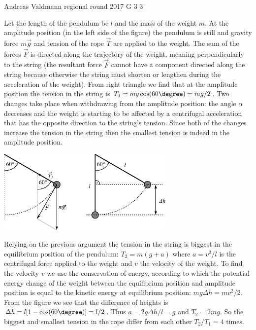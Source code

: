 \documentclass[11pt]{article}
\begin{document}
{Andreas Valdmann} %
{regional round} %
{2017} %
{G 3} %
{3} %
{

\ifEngSolution
Let the length of the pendulum be $l$ and the mass of the weight $m$. At the amplitude position (in the left side of the figure) the pendulum is still and gravity force $m\vec{g}$ and tension of the rope $\vec{T}$ are applied to the weight. The sum of the forces $\vec{F}$ is directed along the trajectory of the weight, meaning perpendicularly to the string (the resultant force $\vec{F}$ cannot have a component directed along the string because otherwise the string must shorten or lengthen during the acceleration of the weight). From right triangle we find that at the amplitude position the tension in the string is $T_1 = mg\cos(60\degree) = mg / 2$. Two changes take place when withdrawing from the amplitude position: the angle $\alpha$ decreases and the weight is starting to be affected by a centrifugal acceleration that has the opposite direction to the string’s tension. Since both of the changes increase the tension in the string then the smallest tension is indeed in the amplitude position.
\begin{center}
	\vspace{-10pt}
	\includegraphics[width=0.65\textwidth]{2017-v2g-03-pendel-joonis}
	\vspace{-15pt}
\end{center}
Relying on the previous argument the tension in the string is biggest in the equilibrium position of the pendulum: $T_2 = m(g + a)$ where $a = v^2 / l$ is the centrifugal force applied to the weight and $v$ the velocity of the weight. To find the velocity $v$ we use the conservation of energy, according to which the potential energy change of the weight between the equilibrium position and amplitude position is equal to the kinetic energy at equilibrium position: $mg\Delta h = mv^2 / 2$. From the figure we see that the difference of heights is $\Delta h = l[1-\cos(60\degree)] = l / 2$. Thus $a = 2g\Delta h / l = g$ and $T_2 = 2mg$. So the biggest and smallest tension in the rope differ from each other $T_2 / T_1 = 4$ times.
\fi
}
\end{document}
